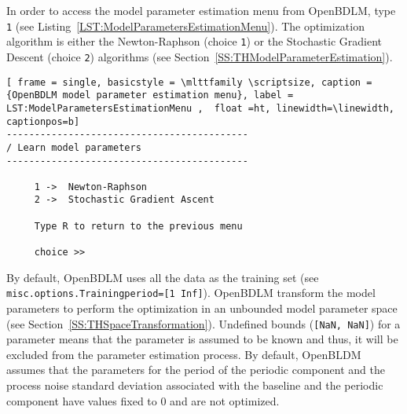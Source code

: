 In order to access the model parameter estimation menu from OpenBDLM, type  \colorbox{light-gray}{\lstinline[basicstyle = \mlttfamily \small, backgroundcolor = \color{light-gray}]!1!} (see Listing~\ref{LST:ModelParametersEstimationMenu}).
The optimization algorithm is either the Newton-Raphson (choice \colorbox{light-gray}{\lstinline[basicstyle = \mlttfamily \small, backgroundcolor = \color{light-gray}]!1!}) or the Stochastic Gradient Descent  (choice \colorbox{light-gray}{\lstinline[basicstyle = \mlttfamily \small, backgroundcolor = \color{light-gray}]!2!}) algorithms (see Section~\ref{SS:THModelParameterEstimation}). \begin{lstlisting}[ frame = single, basicstyle = \mlttfamily \scriptsize, caption = {OpenBDLM model parameter estimation menu}, label = LST:ModelParametersEstimationMenu ,  float =ht, linewidth=\linewidth, captionpos=b]
-------------------------------------------
/ Learn model parameters
-------------------------------------------

     1 ->  Newton-Raphson
     2 ->  Stochastic Gradient Ascent

     Type R to return to the previous menu

     choice >> 
\end{lstlisting}
 By default, OpenBDLM uses all the data as the training set (see \lstinline[basicstyle = \mlttfamily \small ]!misc.options.Trainingperiod=[1 Inf]!).
OpenBDLM transform the model parameters to perform the optimization in an unbounded model parameter space (see Section~\ref{SS:THSpaceTransformation}).
Undefined bounds (\lstinline[basicstyle = \mlttfamily \small ]![NaN, NaN]!)  for a parameter means that the parameter is assumed to be known and thus, it will be excluded from the parameter estimation process.
By default, OpenBLDM assumes that the parameters for the period of the periodic component and the process noise standard deviation associated with the baseline and the periodic component have values fixed to 0 and are not optimized.\\

